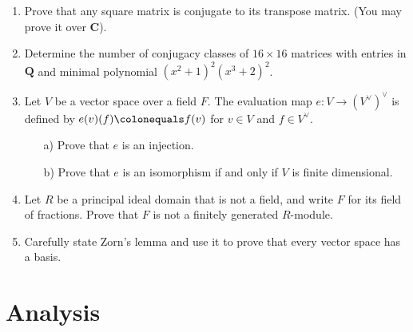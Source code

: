 \documentclass[11pt]{amsart}
\theoremstyle{plain}
\theoremstyle{definition}
\theoremstyle{remark}
\begin{document}
    \begin{enumerate}
        \item Prove that any square matrix is conjugate to its transpose matrix. (You may prove it over $\mathbf{C}$).
        
        \item Determine the number of conjugacy classes of $16 \times 16$ matrices with entries in $\mathbf{Q}$ and minimal polynomial $(x^2+1)^2(x^3+2)^2$.
        
        \item Let $V$ be a vector space over a field $F$. The evaluation map $e\colon V \to (V^\vee)^\vee$ is defined by $e(v)(f) \colonequals f(v)$ for $v\in V$ and $f\in V^\vee$.
            \begin{enumerate}
                \item[a)] Prove that $e$ is an injection.
                \item[b)] Prove that $e$ is an isomorphism if and only if $V$ is finite dimensional.
            \end{enumerate}
            
        \item Let $R$ be a principal ideal domain that is not a field, and write $F$ for its field of fractions. Prove that $F$ is not a finitely generated $R$-module.
        
        \item Carefully state Zorn's lemma and use it to prove that every vector space has a basis.
    \end{enumerate}

\section{Analysis}
\end{document}
